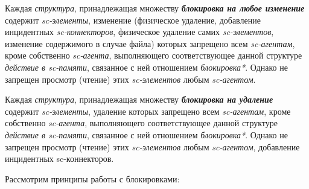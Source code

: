Каждая \textit{структура}, принадлежащая множеству \textbf{\textit{блокировка на любое изменение}} содержит \textit{sc-элементы}, изменение (физическое удаление, добавление инцидентных \textit{sc-коннекторов}, физическое удаление самих \textit{\mbox{sc-элементов}}, изменение содержимого в случае файла) которых запрещено всем \textit{sc-агентам}, кроме собственно \textit{sc-агента}, выполняющего соответствующее данной структуре \textit{действие в sc-памяти}, связанное с ней отношением \textit{блокировка*}. Однако не запрещен просмотр (чтение) этих \textit{sc-элементов} любым \textit{sc-агентом}.

Каждая \textit{структура}, принадлежащая множеству \textbf{\textit{блокировка на удаление}} содержит \textit{sc-элементы}, удаление которых запрещено всем \textit{sc-агентам}, кроме собственно \textit{sc-агента}, выполняющего соответствующее данной структуре \textit{действие в sc-памяти}, связанное с ней отношением \textit{блокировка*}. Однако не запрещен просмотр (чтение) этих \textit{sc-элементов} любым \textit{sc-агентом}, добавление инцидентных sc-коннекторов.

Рассмотрим принципы работы с блокировками:

